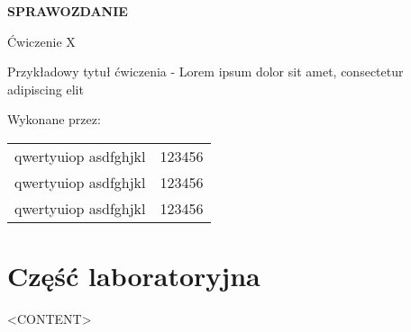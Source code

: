 \documentclass[12pt]{article}
\begin{document}
\begin{titlepage}

\selectfont
\centering

\vspace*{\baselineskip}
\vspace{1\baselineskip}

\begingroup
    \fontsize{25pt}{12pt}
    \selectfont
    \textbf{SPRAWOZDANIE}
\endgroup

\vspace{4\baselineskip}

\begingroup
    \fontsize{21pt}{12pt} \selectfont
    Ćwiczenie X
\endgroup

\vspace{1.5\baselineskip}

\begingroup
    \fontsize{18pt}{18pt}
    \selectfont
    Przykładowy tytuł ćwiczenia - Lorem ipsum dolor sit amet, consectetur adipiscing elit
\endgroup

\vspace{6\baselineskip}

\begin{flushleft}
\begingroup
    \fontsize{16pt}{10pt}\selectfont
    Wykonane przez:
\endgroup
\vspace{0.8\baselineskip}


{\fontsize{14pt}{10pt}\selectfont
\begin{tabular}{ll}
	\hspace{1em}\vspace{0.6em}
	qwertyuiop asdfghjkl & 123456\\
	\hspace{1em}\vspace{0.6em}
	qwertyuiop asdfghjkl & 123456\\
	\hspace{1em}\vspace{0.6em}
	qwertyuiop asdfghjkl & 123456\\
\end{tabular}
}%

\end{flushleft}

\vfill

\end{titlepage}

\section{Część laboratoryjna}

<CONTENT>
\end{document}
